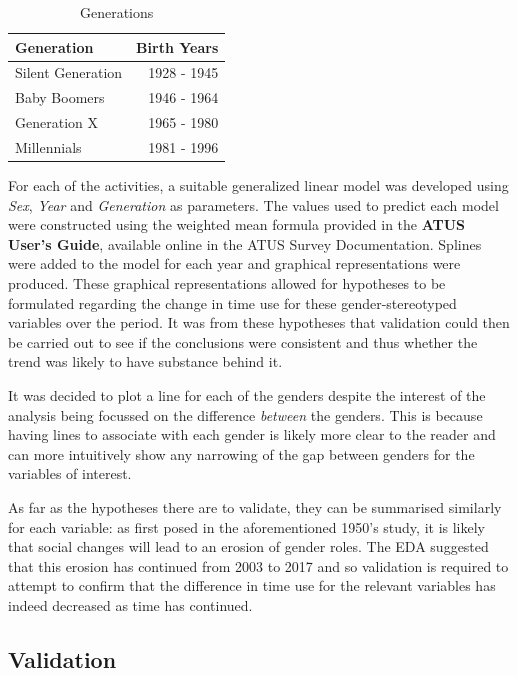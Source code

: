 \documentclass[11pt,]{article}
\begin{document}
\begin{table}

\caption{\label{tab:unnamed-chunk-3}Generations}
\centering
\begin{tabular}[t]{lr}
\toprule
Generation & Birth Years\\
\midrule
Silent Generation & 1928 - 1945\\
Baby Boomers & 1946 - 1964\\
Generation X & 1965 - 1980\\
Millennials & 1981 - 1996\\
\bottomrule
\end{tabular}
\end{table}

For each of the activities, a suitable generalized linear model was
developed using \emph{Sex}, \emph{Year} and \emph{Generation} as
parameters. The values used to predict each model were constructed using
the weighted mean formula provided in the \textbf{ATUS User's Guide},
available online in the ATUS Survey Documentation. Splines were added to
the model for each year and graphical representations were produced.
These graphical representations allowed for hypotheses to be formulated
regarding the change in time use for these gender-stereotyped variables
over the period. It was from these hypotheses that validation could then
be carried out to see if the conclusions were consistent and thus
whether the trend was likely to have substance behind it.

It was decided to plot a line for each of the genders despite the
interest of the analysis being focussed on the difference \emph{between}
the genders. This is because having lines to associate with each gender
is likely more clear to the reader and can more intuitively show any
narrowing of the gap between genders for the variables of interest.

As far as the hypotheses there are to validate, they can be summarised
similarly for each variable: as first posed in the aforementioned 1950's
study, it is likely that social changes will lead to an erosion of
gender roles. The EDA suggested that this erosion has continued from
2003 to 2017 and so validation is required to attempt to confirm that
the difference in time use for the relevant variables has indeed
decreased as time has continued.

\hypertarget{validation-1}{%
\subsection{Validation}\label{validation-1}}
\end{document}
